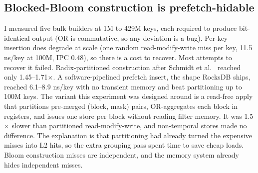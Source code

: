 \documentclass{article}
\begin{document}
\subsection{Blocked-Bloom construction is prefetch-hidable}
I measured five bulk builders at 1M to 429M keys, each required to produce bit-identical output (OR is commutative, so any deviation is a bug). Per-key insertion does degrade at scale (one random read-modify-write miss per key, 11.5 ns/key at 100M, IPC 0.48), so there is a cost to recover. Most attempts to recover it failed. Radix-partitioned construction after Schmidt et al.~\citep{schmidt2021partitioned} reached only 1.45--1.71$\times$. A software-pipelined prefetch insert, the shape RocksDB ships, reached 6.1--8.9 ns/key with no transient memory and beat partitioning up to 100M keys. The variant this experiment was designed around is a read-free apply that partitions pre-merged (block, mask) pairs, OR-aggregates each block in registers, and issues one store per block without reading filter memory. It was 1.5$\times$ slower than partitioned read-modify-write, and non-temporal stores made no difference. The explanation is that partitioning had already turned the expensive misses into L2 hits, so the extra grouping pass spent time to save cheap loads. Bloom construction misses are independent, and the memory system already hides independent misses.
\end{document}
